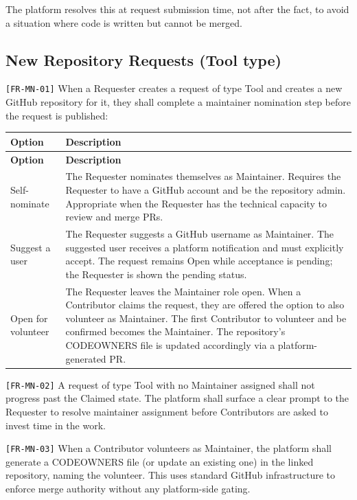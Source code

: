 \documentclass[12pt,a4paper]{article}
\begin{document}
The platform resolves this at request submission time, not after the fact, to avoid a situation where code is written but cannot be merged.

\subsection{New Repository Requests (Tool type)}
\texttt{[FR-MN-01]} When a Requester creates a request of type Tool and creates a new GitHub repository for it, they shall complete a maintainer nomination step before the request is published:

\begin{longtable}{L{3.5cm} L{9.8cm}}
  \color{white}\bfseries Option & \color{white}\bfseries Description \\
  \endfirsthead
  \color{white}\bfseries Option & \color{white}\bfseries Description \\
  \endhead\hline
  Self-nominate    & The Requester nominates themselves as Maintainer. Requires the Requester to have a GitHub account and be the repository admin. Appropriate when the Requester has the technical capacity to review and merge PRs. \\
  Suggest a user   & The Requester suggests a GitHub username as Maintainer. The suggested user receives a platform notification and must explicitly accept. The request remains Open while acceptance is pending; the Requester is shown the pending status. \\
  Open for volunteer & The Requester leaves the Maintainer role open. When a Contributor claims the request, they are offered the option to also volunteer as Maintainer. The first Contributor to volunteer and be confirmed becomes the Maintainer. The repository's CODEOWNERS file is updated accordingly via a platform-generated PR. \\
  \hline
\end{longtable}

\texttt{[FR-MN-02]} A request of type Tool with no Maintainer assigned shall not progress past the Claimed state. The platform shall surface a clear prompt to the Requester to resolve maintainer assignment before Contributors are asked to invest time in the work.

\texttt{[FR-MN-03]} When a Contributor volunteers as Maintainer, the platform shall generate a CODEOWNERS file (or update an existing one) in the linked repository, naming the volunteer. This uses standard GitHub infrastructure to enforce merge authority without any platform-side gating.
\end{document}
